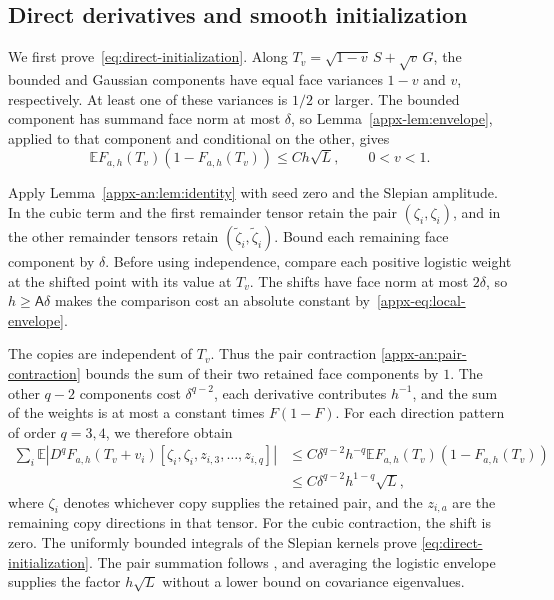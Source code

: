 \documentclass[11pt,letterpaper]{article}
\theoremstyle{remark}
\newcommand{\E}{\mathbb E}
\begin{document}
\subsection{Direct derivatives and smooth initialization}
\label{appx-an:sec:initialization}

We first prove~\eqref{eq:direct-initialization}. Along
\(T_v=\sqrt{1-v}\,S+\sqrt v\,G\), the bounded and Gaussian
components have equal face variances \(1-v\) and \(v\), respectively.
At least one of these variances is \(1/2\) or larger. The bounded
component has summand face
norm at most \(\delta\), so Lemma~\ref{appx-lem:envelope}, applied
to that component and conditional on the other, gives
\begin{equation}
 \E F_{a,h}(T_v)(1-F_{a,h}(T_v))\le Ch\sqrt L,
 \qquad 0<v<1.
 \label{eq:slepian-weight}
\end{equation}

Apply Lemma~\ref{appx-an:lem:identity} with seed zero and the Slepian
amplitude. In the cubic term and the first remainder tensor retain
the pair \((\zeta_i,\zeta_i)\), and in the other remainder tensors
retain \((\widetilde\zeta_i,\widetilde\zeta_i)\). Bound each
remaining face component by \(\delta\). Before using independence,
compare each positive logistic weight at the shifted point with its
value at \(T_v\). The shifts have face norm at most \(2\delta\),
so \(h\ge\mathsf A\delta\) makes the comparison cost an absolute
constant by~\eqref{appx-eq:local-envelope}.

The copies are independent of \(T_v\). Thus the pair contraction
\eqref{appx-an:pair-contraction} bounds the sum of their two retained
face components by \(1\). The other \(q-2\) components cost
\(\delta^{q-2}\), each derivative contributes \(h^{-1}\), and
the sum of the weights is at most a constant times \(F(1-F)\).
For each direction pattern of order \(q=3,4\), we therefore obtain
\[
 \begin{aligned}
 \sum_i\E\left|D^qF_{a,h}(T_v+v_i)
       [\zeta_i,\zeta_i,z_{i,3},\ldots,z_{i,q}]\right|
 &\le C\delta^{q-2}h^{-q}\E F_{a,h}(T_v)(1-F_{a,h}(T_v))\\
 &\le C\delta^{q-2}h^{1-q}\sqrt L,
 \end{aligned}
\]
where \(\zeta_i\) denotes whichever copy supplies the retained pair,
and the \(z_{i,a}\) are the remaining copy directions in that tensor.
For the cubic contraction, the shift is zero.
The uniformly bounded integrals of the Slepian kernels prove
\eqref{eq:direct-initialization}. The pair summation follows
\cite[Lemma~4.1]{AL}, and averaging the logistic envelope supplies
the factor \(h\sqrt L\) without a lower bound on covariance
eigenvalues.
\end{document}
